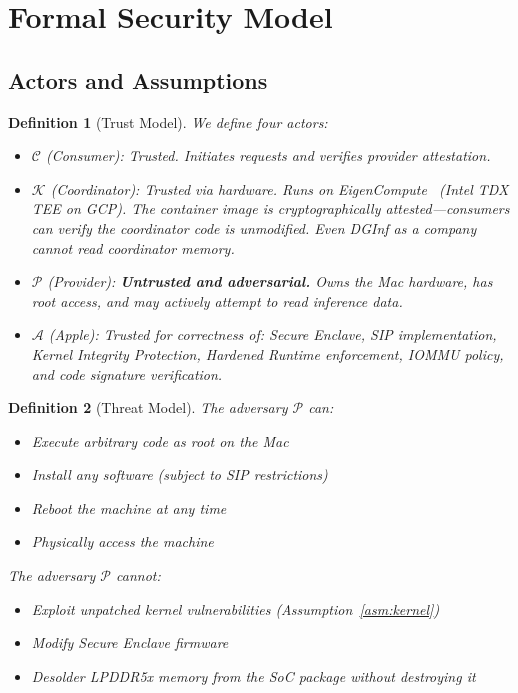 \documentclass[10pt,twocolumn,letterpaper]{article}
\newtheorem{definition}{Definition}
\begin{document}
\section{Formal Security Model}

\subsection{Actors and Assumptions}

\begin{definition}[Trust Model]
\label{def:trust}
We define four actors:
\begin{itemize}[leftmargin=*,itemsep=1pt,topsep=2pt]
    \item $\mathcal{C}$ (Consumer): Trusted. Initiates requests and verifies provider attestation.
    \item $\mathcal{K}$ (Coordinator): Trusted via hardware. Runs on EigenCompute~\cite{eigencloud} (Intel TDX TEE on GCP). The container image is cryptographically attested---consumers can verify the coordinator code is unmodified. Even DGInf as a company cannot read coordinator memory.
    \item $\mathcal{P}$ (Provider): \textbf{Untrusted and adversarial.} Owns the Mac hardware, has root access, and may actively attempt to read inference data.
    \item $\mathcal{A}$ (Apple): Trusted for correctness of: Secure Enclave, SIP implementation, Kernel Integrity Protection, Hardened Runtime enforcement, IOMMU policy, and code signature verification.
\end{itemize}
\end{definition}

\begin{definition}[Threat Model]
The adversary $\mathcal{P}$ can:
\begin{itemize}[leftmargin=*,itemsep=1pt]
    \item Execute arbitrary code as root on the Mac
    \item Install any software (subject to SIP restrictions)
    \item Reboot the machine at any time
    \item Physically access the machine
\end{itemize}
The adversary $\mathcal{P}$ \emph{cannot}:
\begin{itemize}[leftmargin=*,itemsep=1pt]
    \item Exploit unpatched kernel vulnerabilities (Assumption~\ref{asm:kernel})
    \item Modify Secure Enclave firmware
    \item Desolder LPDDR5x memory from the SoC package without destroying it
\end{itemize}
\end{definition}
\end{document}
